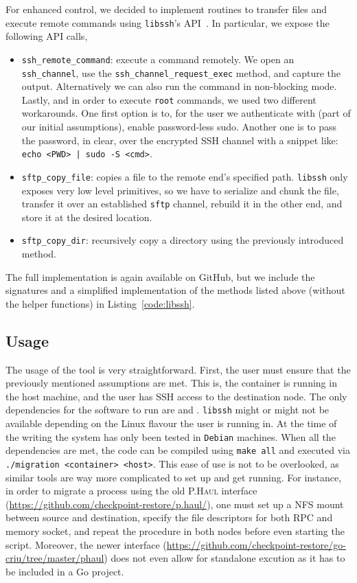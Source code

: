 For enhanced control, we decided to implement routines to transfer files and execute remote commands using \texttt{libssh}'s API~\cite{libssh,libssh-api}.
In particular, we expose the following API calls,
\begin{itemize}
    \item \texttt{ssh\_remote\_command}: execute a command remotely. We open an \texttt{ssh\_channel}, use the \texttt{ssh\_channel\_request\_exec} method, and capture the output. Alternatively we can also run the command in non-blocking mode. Lastly, and in order to execute \texttt{root} commands, we used two different workarounds. One first option is to, for the user we authenticate with (part of our initial assumptions), enable password-less sudo. Another one is to pass the password, in clear, over the encrypted SSH channel with a snippet like: \texttt{echo <PWD> | sudo -S <cmd>}.
    \item \texttt{sftp\_copy\_file}: copies a file to the remote end's specified path. \texttt{libssh} only exposes very low level primitives, so we have to serialize and chunk the file, transfer it over an established \texttt{sftp} channel, rebuild it in the other end, and store it at the desired location.
    \item \texttt{sftp\_copy\_dir}: recursively copy a directory using the previously introduced method.
\end{itemize}
The full implementation is again available on GitHub, but we include the signatures and a simplified implementation of the methods listed above (without the helper functions) in Listing~\ref{code:libssh}.

\subsection{Usage}

The usage of the tool is very straightforward.
First, the user must ensure that the previously mentioned assumptions are met.
This is, the container is running in the host machine, and the user has SSH access to the destination node.
The only dependencies for the software to run are \criu and \runc.
\texttt{libssh} might or might not be available depending on the Linux flavour the user is running in.
At the time of the writing the system has only been tested in \texttt{Debian} machines.
When all the dependencies are met, the code can be compiled using \texttt{make all} and executed via \texttt{./migration <container> <host>}.
This ease of use is not to be overlooked, as similar tools are way more complicated to set up and get running.
For instance, in order to migrate a process using the old \textsc{P.Haul} interface (\url{https://github.com/checkpoint-restore/p.haul/}), one must set up a NFS mount between source and destination, specify the file descriptors for both RPC and memory socket, and repeat the procedure in both nodes before even starting the script.
Moreover, the newer interface (\url{https://github.com/checkpoint-restore/go-criu/tree/master/phaul}) does not even allow for standalone excution as it has to be included in a Go project.
